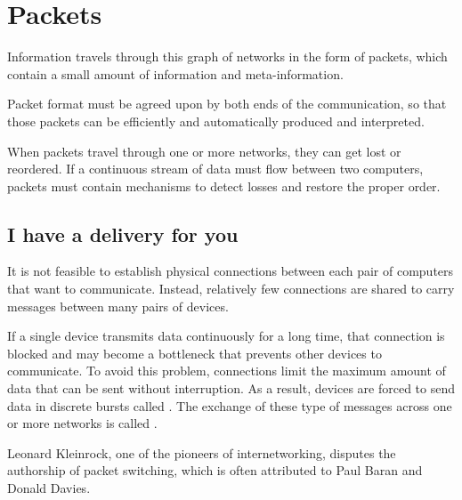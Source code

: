 
\chapter{Packets}\label{sec:packets}

Information travels through this graph of networks in the form of packets, which contain a small amount of 
information and meta-information. 

Packet format must be agreed upon by both ends of the communication, so that those packets can be efficiently 
and automatically produced and interpreted.

When packets travel through one or more networks, they can get lost or reordered. If a continuous stream of data must 
flow between two computers, packets must contain mechanisms to detect losses and restore the proper order.

\section{I have a delivery for you}\label{sec:packets:lan_wan}

It is not feasible to establish physical connections between each pair of computers that want to communicate.
Instead, relatively few connections are shared to carry messages between many pairs of devices.

If a single device transmits data continuously for a long time, that connection is blocked and may become a bottleneck that 
prevents other devices to communicate. To avoid this problem, connections limit the maximum amount of data
that can be sent without interruption. As a result, devices are forced to send data in discrete bursts called 
. The exchange of these type of messages across one or more networks is called
.

\begin{remark}
%  
% 

Leonard Kleinrock, one of the pioneers of internetworking, disputes the authorship of packet switching,
which is often attributed to Paul Baran and Donald Davies.
\end{remark}

